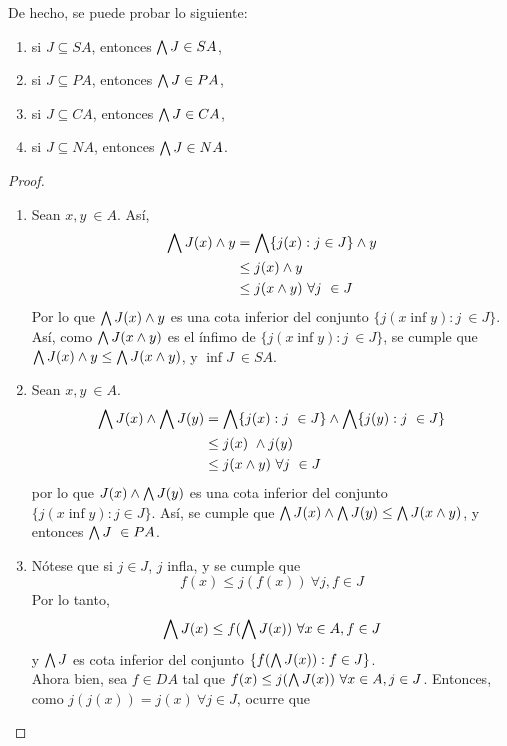 De hecho, se puede probar lo siguiente:
\begin{lemma}%
    \leavevmode
  \begin{enumerate}
    \item si $J\subseteq SA$, entonces $\bigwedge J\in SA$,
    \item si $J\subseteq PA$, entonces $\bigwedge J\in PA$,
    \item si $J\subseteq CA$, entonces $\bigwedge J\in CA$,
    \item si $J\subseteq NA$, entonces $\bigwedge J\in NA$.
  \end{enumerate}
\end{lemma}
\begin{proof}
    \begin{enumerate}
        \item Sean $x,y \ \in A$.  Así, 
        \begin{align*}
            \bigwedge J(x)\wedge y&=\bigwedge\{j(x):j\in J\}\wedge y\\
            &\leq j(x)\wedge y\\
            &\leq j(x\wedge y) \ \forall j \ \in J
        \end{align*}
        Por lo que $\bigwedge J(x)\wedge y$ es una cota inferior del conjunto $\{j(x\inf y) : j \ \in J\}$. Así, como $\bigwedge J(x\wedge y)$ es el ínfimo de $\{j(x\inf y) : j \ \in J\}$, se cumple que $\bigwedge J(x)\wedge y\leq \bigwedge J(x\wedge y)$, y $\inf J \ \in SA$.
        \item Sean $x, y \ \in A$. 
        \begin{align*}
            \bigwedge J(x)\wedge \bigwedge J(y)&=\bigwedge\{j(x):j \ \in J\} \wedge \bigwedge \{j(y) : j \ \in J\}\\
            &\leq j(x) \ \wedge j(y) \\
            &\leq j(x\wedge y) \ \forall j \ \in J
        \end{align*}
        por lo que $J(x)\wedge \bigwedge J(y)$ es una cota inferior del conjunto $\{j(x\inf y): j \in J\}$. Así, se cumple que $\bigwedge J(x) \wedge \bigwedge J(y)\leq \bigwedge J(x\wedge y)$, y entonces $\bigwedge J \ \in PA$.
        \item Nótese que si $j\in J$, $j$ infla, y se cumple que 
        $$f(x)\leq j(f(x)) \ \forall j,f \in J$$
        Por lo tanto, 
        $$\Inf J(x)\leq f(\Inf J(x)) \ \forall x\in A, f\in J$$
        y $\bigwedge J$ es cota inferior del conjunto $\{f(\bigwedge J(x)):f\in J\}$.
        \\
        Ahora bien, sea $f\in DA$ tal que $f(x) \leq j(\bigwedge J(x)) \ \forall x\in A, j\in J$. Entonces, como $j(j(x))=j(x) \ \forall j\in J$, ocurre que 

\end{enumerate}
\end{proof}

